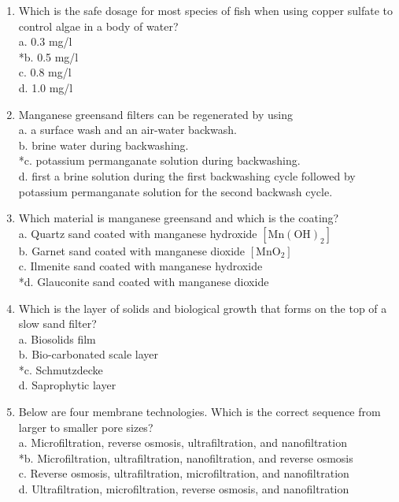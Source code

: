 \begin{enumerate}
  \item Which is the safe dosage for most species of fish when using copper sulfate to control algae in a body of water?\\
a.  0.3 mg/l\\
*b. 0.5 mg/l\\
c.  0.8 mg/l\\
d. 1.0 mg/l\\
  \item Manganese greensand filters can be regenerated by using\\
a. a surface wash and an air-water backwash.\\
b. brine water during backwashing.\\
*c. potassium permanganate solution during backwashing.\\
d. first a brine solution during the first backwashing cycle followed by potassium permanganate solution for the second backwash cycle.\\

 \item Which material is manganese greensand and which is the coating?\\
a. Quartz sand coated with manganese hydroxide $\left[\mathrm{Mn}(\mathrm{OH})_{2}\right]$\\
b. Garnet sand coated with manganese dioxide $\left[\mathrm{MnO}_{2}\right]$\\
c. Ilmenite sand coated with manganese hydroxide\\
*d. Glauconite sand coated with manganese dioxide\\
  \item Which is the layer of solids and biological growth that forms on the top of a slow sand filter?\\
a. Biosolids film\\
b. Bio-carbonated scale layer\\
*c. Schmutzdecke\\
d. Saprophytic layer 

  \item Below are four membrane technologies. Which is the correct sequence from larger to smaller pore sizes?\\
a. Microfiltration, reverse osmosis, ultrafiltration, and nanofiltration\\
*b. Microfiltration, ultrafiltration, nanofiltration, and reverse osmosis\\
c. Reverse osmosis, ultrafiltration, microfiltration, and nanofiltration\\
d. Ultrafiltration, microfiltration, reverse osmosis, and nanofiltration\\



\end{enumerate}

